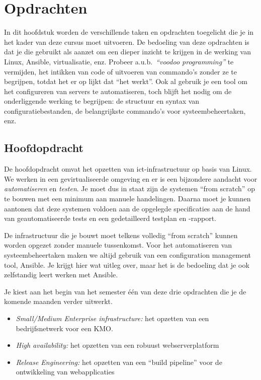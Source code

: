 \chapter{Opdrachten}%
\label{ch:opdrachten}

In dit hoofdstuk worden de verschillende taken en opdrachten toegelicht die je in het kader van deze cursus moet uitvoeren. De bedoeling van deze opdrachten is dat je die gebruikt als aanzet om een dieper inzicht te krijgen in de werking van Linux, Ansible, virtualisatie, enz. Probeer a.u.b.~\emph{``voodoo programming''} te vermijden, het intikken van code of uitvoeren van commando's zonder ze te begrijpen, totdat het er op lijkt dat ``het werkt''. Ook al gebruik je een tool om het configureren van servers te automatiseren, toch blijft het nodig om de onderliggende werking te begrijpen: de structuur en syntax van configuratiebestanden, de belangrijkste commando's voor systeembeheertaken, enz.

\section{Hoofdopdracht}%
\label{sec:hoofdopdracht}

De hoofdopdracht omvat het opzetten van ict-infrastructuur op basis van Linux. We werken in een gevirtualiseerde omgeving en er is een bijzondere aandacht voor \emph{automatiseren} en \emph{testen}. Je moet dus in staat zijn de systemen ``from scratch'' op te bouwen met een minimum aan manuele handelingen. Daarna moet je kunnen aantonen dat deze systemen voldoen aan de opgelegde specificaties aan de hand van geautomatiseerde tests en een gedetailleerd testplan en -rapport.

De infrastructuur die je bouwt moet telkens volledig ``from scratch'' kunnen worden opgezet zonder manuele tussenkomst. Voor het automatiseren van systeembeheertaken maken we altijd gebruik van een configuration management tool, Ansible. Je krijgt hier wat uitleg over, maar het is de bedoeling dat je ook zelfstandig leert werken met Ansible.

Je kiest aan het begin van het semester één van deze drie opdrachten die je de komende maanden verder uitwerkt.

\begin{itemize}
\item \emph{Small/Medium Enterprise infrastructure:} het opzetten van een bedrijfsnetwerk voor een KMO.
\item \emph{High availability:} het opzetten van een robuust webserverplatform
\item \emph{Release Engineering:} het opzetten van een ``build pipeline'' voor de ontwikkeling van webapplicaties
\end{itemize}

